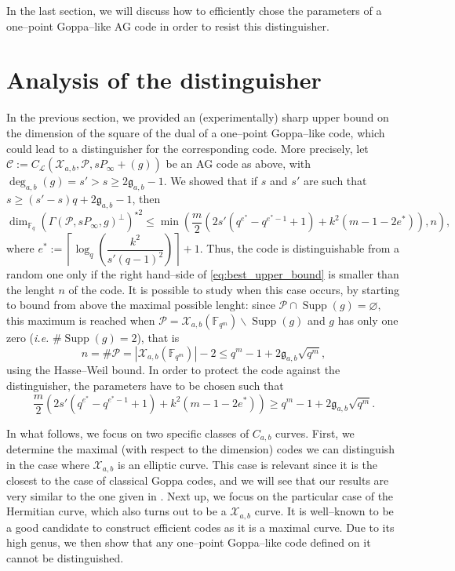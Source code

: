 \documentclass[a4paper]{amsart}
\theoremstyle{definition}
\theoremstyle{remark}
\newcommand{\calP}{\mathcal{P}}
\newcommand{\calL}{\mathcal{L}}
\newcommand{\calC}{\mathcal{C}}
\newcommand{\calX}{\mathcal{X}}
\newcommand{\fqm}{\mathbb{F}_{q^m}}
\newcommand{\fq}{\mathbb{F}_{q}}
\newcommand{\Supp}{\operatorname{Supp}}
\newcommand{\degab}[1]{\deg_{a,b}\left(#1\right)}
\begin{document}
In the last section, we will discuss how to efficiently chose the parameters of a one--point Goppa--like AG code in order to resist this distinguisher.

\section{Analysis of the distinguisher}\label{sec:analysis}

In the previous section, we provided an (experimentally) sharp upper bound on the dimension of the square of the dual of a one--point Goppa--like code, which could lead to a distinguisher for the corresponding code. More precisely, let $\calC := C_\calL(\calX_{a,b},\calP,sP_\infty +(g))$ be an AG code as above, with $\degab{g} = s'>s\geq 2\mathfrak{g}_{a,b}-1$. We showed that if $s$ and $s'$ are such that $s \geq (s'-s)q+2\mathfrak{g}_{a,b}-1$, then
\begin{equation} \label{eq:best_upper_bound}
\dim_{\fq} (\Gamma(\calP,sP_\infty,g)^{\perp})^{\star 2} \leq \min \left(\frac{m}{2}\left(2s'(q^{e^*}-q^{e^*-1}+1)+k^2(m-1-2e^*)  \right),n\right),
\end{equation}
where $e^* := \left\lceil \log_q\left(\dfrac{k^2}{s'(q-1)^2}\right)\right\rceil+1$. Thus, the code is distinguishable from a random one only if the right hand--side of \eqref{eq:best_upper_bound} is smaller than the lenght $n$ of the code. It is possible to study when this case occurs, by starting to bound from above the maximal possible lenght: since $\calP \cap \Supp(g) = \varnothing,$ this maximum is reached when $\calP = \calX_{a,b}(\fqm) \backslash \Supp(g)$ and $g$ has only one zero (\emph{i.e.} $\#\Supp(g)=2$), that is
$$n = \# \calP = |\calX_{a,b}(\fqm)|-2 \leq q^m-1+2\mathfrak{g}_{a,b}\sqrt{q^m},$$
using the Hasse--Weil bound. In order to protect the code against the distinguisher, the parameters have to be chosen such that 
\begin{equation} \label{eq:cond_not_to_distinguish}
\frac{m}{2}\left(2s'(q^{e^*}-q^{e^*-1}+1)+k^2(m-1-2e^*)  \right)\geq q^m-1+2\mathfrak{g}_{a,b}\sqrt{q^m}.
\end{equation}

In what follows, we focus on two specific classes of $C_{a,b}$ curves. First, we determine the maximal (with respect to the dimension) codes we can distinguish in the case where $\calX_{a,b}$ is an elliptic curve. This case is relevant since it is the closest to the case of classical Goppa codes, and we will see that our results are very similar to the one given in \cite{MT21}. Next up, we focus on the particular case of the Hermitian curve, which also turns out to be a $\calX_{a,b}$ curve. It is well--known to be a good candidate to construct efficient codes as it is a maximal curve. Due to its high genus, we then show that any one--point Goppa--like code defined on it cannot be distinguished.
\end{document}
